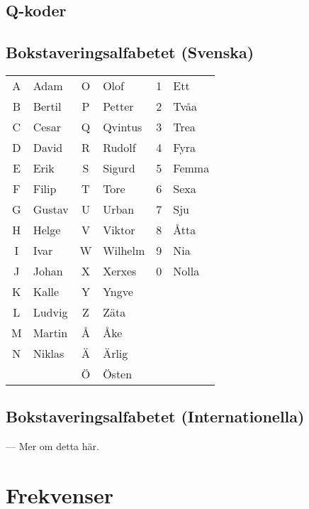 \documentclass[12pt,swedish,a4paper]{article}
\begin{document}
\subsection{Q-koder}

\subsection{Bokstaveringsalfabetet (Svenska)}

\begin{tabular}{cl|cl|cl }
	A & Adam   & O & Olof    & 1 & Ett \\
	B & Bertil & P & Petter  & 2 & Tvåa \\
	C & Cesar  & Q & Qvintus & 3 & Trea \\
	D & David  & R & Rudolf  & 4 & Fyra \\
	E & Erik   & S & Sigurd  & 5 & Femma \\
	F & Filip  & T & Tore    & 6 & Sexa \\
	G & Gustav & U & Urban   & 7 & Sju \\
	H & Helge  & V & Viktor  & 8 & Åtta \\
	I & Ivar   & W & Wilhelm & 9 & Nia \\
	J & Johan  & X & Xerxes  & 0 & Nolla \\
	K & Kalle  & Y & Yngve   &   &  \\
	L & Ludvig & Z & Zäta    &   &  \\
	M & Martin & Å & Åke     &   &  \\
	N & Niklas & Ä & Ärlig   &   &  \\
	  &        & Ö & Östen   &   &
\end{tabular}

\subsection{Bokstaveringsalfabetet (Internationella)}

--- Mer om detta här.

\section{Frekvenser}

\tiny
\end{document}
